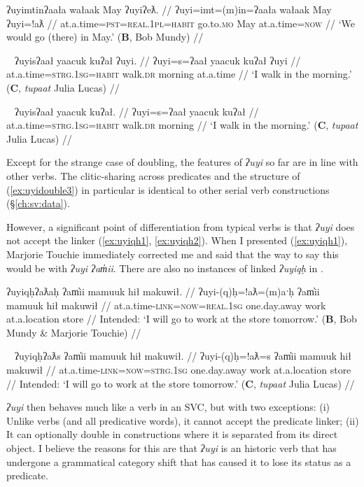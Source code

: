 \ex \label{ex:uyidouble1}
\begingl
\glpreamble ʔuyimtinʔaała wałaak May ʔuyiʔeƛ. //
\gla ʔuyi=imt=(m)in=ʔaała wałaak May ʔuyi=!aƛ //
\glb at.a.time=\textsc{pst}=\textsc{real.1pl}=\textsc{habit} go.to.\textsc{mo} May at.a.time=\textsc{now} //
\glft `We would go (there) in May.' (\textbf{B}, Bob Mundy) //
\endgl
\xe

\ex~ \label{ex:uyidouble2}
\begingl
\glpreamble ʔuyisʔaał yaacuk kuʔał ʔuyi. //
\gla ʔuyi=s=ʔaał yaacuk kuʔał ʔuyi //
\glb at.a.time=\textsc{strg.1sg}=\textsc{habit} walk.\textsc{dr} morning at.a.time //
\glft `I walk in the morning.' (\textbf{C}, \textit{tupaat} Julia Lucas) //
\endgl
\xe

\ex~ \label{ex:uyidouble3}
\begingl
\glpreamble ʔuyisʔaał yaacuk kuʔał. //
\gla ʔuyi=s=ʔaał yaacuk kuʔał //
\glb at.a.time=\textsc{strg.1sg}=\textsc{habit} walk.\textsc{dr} morning //
\glft `I walk in the morning.' (\textbf{C}, \textit{tupaat} Julia Lucas) //
\endgl
\xe

Except for the strange case of doubling, the features of \textit{ʔuyi} so far are in line with other verbs. The clitic-sharing across predicates and the structure of (\ref{ex:uyidouble3}) in particular is identical to other serial verb constructions (\S\ref{ch:sv:data}).

However, a significant point of differentiation from typical verbs is that \textit{ʔuyi} does not accept the linker (\ref{ex:uyiqh1}, \ref{ex:uyiqh2}). When I presented (\ref{ex:uyiqh1}), Marjorie Touchie immediately corrected me and said that the way to say this would be with \textit{ʔuyi ʔam̓ii}. There are also no instances of linked \textit{ʔuyiqḥ} in \citet{sapir1939, sapir1955}.

\ex \label{ex:uyiqh1}
\begingl
\glpreamble *ʔuyiqḥʔaƛaḥ ʔam̓ii mamuuk hił makuwił. //
\gla ʔuyi-(q)ḥ=!aƛ=(m)aˑḥ ʔam̓ii mamuuk hił makuwił //
\glb at.a.time-\textsc{link}=\textsc{now}=\textsc{real.1sg} one.day.away work at.a.location store //
\glft Intended: `I will go to work at the store tomorrow.' (\textbf{B}, Bob Mundy \& Marjorie Touchie) //
\endgl
\xe

\ex~ \label{ex:uyiqh2}
\begingl
\glpreamble *ʔuyiqḥʔaƛs ʔam̓ii mamuuk hił makuwił. //
\gla ʔuyi-(q)ḥ=!aƛ=s ʔam̓ii mamuuk hił makuwił //
\glb at.a.time-\textsc{link}=\textsc{now}=\textsc{strg.1sg} one.day.away work at.a.location store //
\glft Intended: `I will go to work at the store tomorrow.' (\textbf{C}, \textit{tupaat} Julia Lucas) //
\endgl
\xe

\textit{ʔuyi} then behaves much like a verb in an SVC, but with two exceptions: (i) Unlike verbs (and all predicative words), it cannot accept the predicate linker; (ii) It can optionally double in constructions where it is separated from its direct object. I believe the reasons for this are that \textit{ʔuyi} is an historic verb that has undergone a grammatical category shift that has caused it to lose its status as a predicate.

